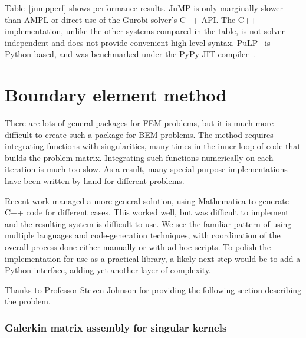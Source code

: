 Table~\ref{jumpperf} shows performance results.
JuMP is only marginally slower than AMPL or direct use of the Gurobi solver's
C++ API.
The C++ implementation, unlike the other systems compared in the table,
is not solver-independent and does not provide convenient high-level syntax.
PuLP~\cite{mitchell2011pulp} is Python-based, and was benchmarked under the
PyPy JIT compiler~\cite{pypyjit}.


\section{Boundary element method}
\label{sec:BEM}

There are lots of general packages for FEM problems, but it is much more
difficult to create such a package for BEM problems.
The method requires integrating functions with singularities, many times
in the inner loop of code that builds the problem matrix.
Integrating such functions numerically on each iteration is much too slow.
As a result, many special-purpose implementations have been written by hand
for different problems.

Recent work \cite{ReidWhJo14} managed a more general solution,
using Mathematica to generate C++ code for different cases.
This worked well, but was difficult to implement and the resulting system
is difficult to use.
We see the familiar pattern of using multiple languages and
code-generation techniques, with coordination of the overall process done
either manually or with ad-hoc scripts.
To polish the implementation for use as a practical library, a likely next
step would be to add a Python interface, adding yet another layer of complexity.






Thanks to Professor Steven Johnson for providing the following section describing
the problem.

\subsubsection{Galerkin matrix assembly for singular kernels}

